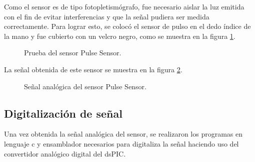 Como el sensor es de tipo fotopletismógrafo, fue necesario aislar la luz emitida con el fin de evitar interferencias y que la señal pudiera ser medida correctamente. Para lograr esto, se colocó el sensor de pulso en el dedo índice de la mano y fue cubierto con un velcro negro, como se muestra en la figura \ref{fig:PulseSensor1}.\\

\begin{figure}[htbp!]
	\centering
	\caption{Prueba del sensor Pulse Sensor.}
	\label{fig:PulseSensor1}
\end{figure}

La señal obtenida de este sensor se muestra en la figura \ref{fig:PulseSensor3}.	
\begin{figure}[htbp!]
	\centering
	\caption{Señal analógica del sensor Pulse Sensor.}
	\label{fig:PulseSensor3}
\end{figure}

\newpage	
\subsection{Digitalización de señal}
Una vez obtenida la señal analógica del sensor, se realizaron los programas en lenguaje c y ensamblador necesarios para digitaliza la señal haciendo uso del convertidor analógico digital del dsPIC.\\


